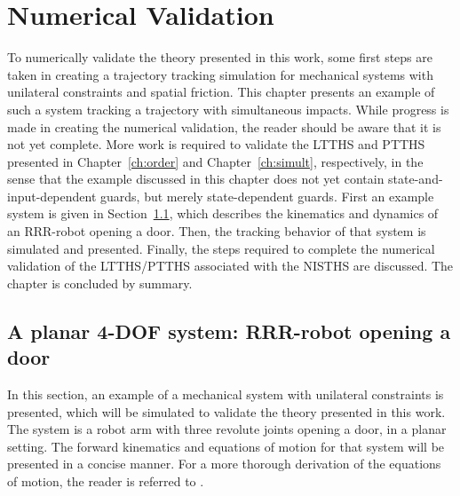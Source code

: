 \documentclass[../DC2019003Bouma.tex]{subfiles}
\begin{document}
\graphicspath{{04_Validation/img/}}
\renewcommand{\chaptermark}[1]{\markboth{\thechapter.\ #1}{}}
\renewcommand{\sectionmark}[1]{\markright{#1}{}}
\pagestyle{fancyreport}
\cleartooddpage
\pagestyle{fancyreport}
\chapter{Numerical Validation}\label{ch:vali}
To numerically validate the theory presented in this work, some first steps are taken in creating a trajectory tracking simulation for mechanical systems with unilateral constraints and spatial friction. This chapter presents an example of such a system tracking a trajectory with simultaneous impacts. While progress is made in creating the numerical validation, the reader should be aware that it is not yet complete. More work is required to validate the LTTHS and PTTHS presented in Chapter~\ref{ch:order} and Chapter~\ref{ch:simult}, respectively, in the sense that the example discussed in this chapter does not yet contain state-and-input-dependent guards, but merely state-dependent guards. First an example system is given in Section~\ref{sec:5sys}, which describes the kinematics and dynamics of an RRR-robot opening a door. Then, the tracking behavior of that system is simulated and presented. Finally, the steps required to complete the numerical validation of the LTTHS/PTTHS associated with the NISTHS are discussed. The chapter is concluded by summary.

\section{A planar 4-DOF system: RRR-robot opening a door}\label{sec:5sys}
In this section, an example of a mechanical system with unilateral constraints is presented, which will be simulated to validate the theory presented in this work. The system is a robot arm with three revolute joints opening a door, in a planar setting. The forward kinematics and equations of motion for that system will be presented in a concise manner. For a more thorough derivation of the equations of motion, the reader is referred to \cite{Rijnen2018b}. 
\end{document}
